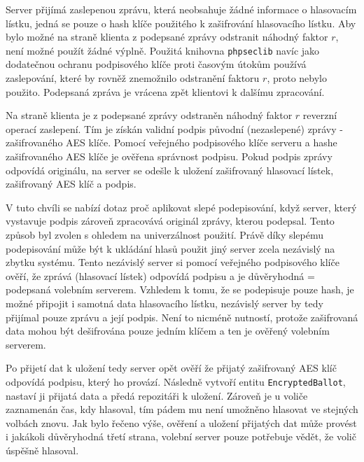 Server přijímá zaslepenou zprávu, která neobsahuje žádné informace o hlasovacím lístku, jedná se pouze o hash klíče použitého k zašifrování hlasovacího lístku. Aby bylo možné na straně klienta z podepsané zprávy odstranit náhodný faktor $r$, není možné použít žádné výplně. Použitá knihovna \texttt{phpseclib} navíc jako dodatečnou ochranu podpisového klíče proti časovým útokům používá zaslepování\cite{phpseclibBlinding}, které by rovněž znemožnilo odstranění faktoru $r$, proto nebylo použito. Podepsaná zpráva je vrácena zpět klientovi k dalšímu zpracování.

Na straně klienta je z podepsané zprávy odstraněn náhodný faktor $r$ reverzní operací zaslepení. Tím je získán validní podpis původní (nezaslepené) zprávy - zašifrovaného AES klíče. Pomocí veřejného podpisového klíče serveru a hashe zašifrovaného AES klíče je ověřena správnost podpisu. Pokud podpis zprávy odpovídá originálu, na server se odešle k uložení zašifrovaný hlasovací lístek, zašifrovaný AES klíč a podpis.



V tuto chvíli se nabízí dotaz proč aplikovat slepé podepisování, když server, který vystavuje podpis zároveň zpracovává originál zprávy, kterou podepsal. Tento způsob byl zvolen s ohledem na univerzálnost použití. Právě díky slepému podepisování může být k ukládání hlasů použit jiný server zcela nezávislý na zbytku systému. Tento nezávislý server si pomocí veřejného podpisového klíče ověří, že zprává (hlasovací lístek) odpovídá podpisu a je důvěryhodná = podepsaná volebním serverem. Vzhledem k tomu, že se podepisuje pouze hash, je možné připojit i samotná data hlasovacího lístku, nezávislý server by tedy přijímal pouze zprávu a její podpis. Není to nicméně nutností, protože zašifrovaná data mohou být dešifrována pouze jedním klíčem a ten je ověřený volebním serverem.

Po přijetí dat k uložení tedy server opět ověří že přijatý zašifrovaný AES klíč odpovídá podpisu, který ho provází. Následně vytvoří entitu \texttt{EncryptedBallot}, nastaví ji přijatá data a předá repozitáři k uložení. Zároveň je u voliče zaznamenán čas, kdy hlasoval, tím pádem mu není umožněno hlasovat ve stejných volbách znovu. Jak bylo řečeno výše, ověření a uložení přijatých dat může provést i jakákoli důvěryhodná třetí strana, volební server pouze potřebuje vědět, že volič úspěšně hlasoval.

